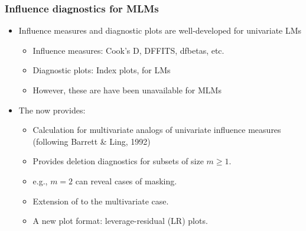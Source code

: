 \begin{frame}
  \frametitle{Influence diagnostics for MLMs}

  \begin{itemize}
  \item Influence measures and diagnostic plots are well-developed for univariate LMs
    \begin{itemize}
    \item Influence measures: Cook's D, DFFITS, dfbetas, etc.
    \item Diagnostic plots:  Index plots,  for LMs
    \item However, these are have been unavailable for MLMs  
    \end{itemize}
  \item
    The  now provides:
    \begin{itemize}
    \item Calculation for multivariate analogs of univariate influence measures
    (following Barrett \& Ling, 1992)
    \item Provides deletion diagnostics for subsets of size $m \ge 1$.
    \item e.g., $m=2$ can reveal cases of \alert{masking}.
    \item Extension of  to the multivariate case.
    \item A new plot format: leverage-residual (LR) plots.
    \end{itemize}
  \end{itemize}
\end{frame}

